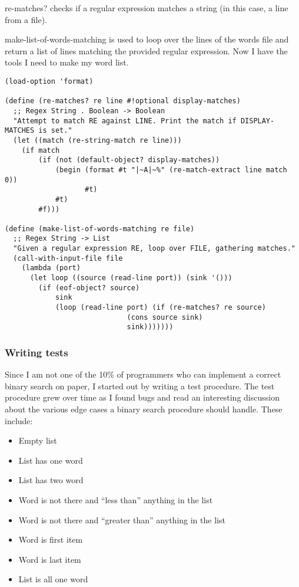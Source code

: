 \documentclass[12pt,openright,draft]{book}
\begin{document}
re-matches? checks if a regular expression matches a string (in this
case, a line from a file).

make-list-of-words-matching is used to loop over the lines of the
words file and return a list of lines matching the provided regular
expression.  Now I have the tools I need to make my word list.

\begin{verbatim}
(load-option 'format)

(define (re-matches? re line #!optional display-matches)
  ;; Regex String . Boolean -> Boolean
  "Attempt to match RE against LINE. Print the match if DISPLAY-MATCHES is set."
  (let ((match (re-string-match re line)))
    (if match
        (if (not (default-object? display-matches))
            (begin (format #t "|~A|~%" (re-match-extract line match 0))
                   #t)
            #t)
        #f)))

(define (make-list-of-words-matching re file)
  ;; Regex String -> List
  "Given a regular expression RE, loop over FILE, gathering matches."
  (call-with-input-file file
    (lambda (port)
      (let loop ((source (read-line port)) (sink '()))
        (if (eof-object? source)
            sink
            (loop (read-line port) (if (re-matches? re source)
                             (cons source sink)
                             sink)))))))
\end{verbatim}

\subsubsection{Writing tests}

Since I am not one of the 10\% of programmers who can implement a
correct binary search on paper, I started out by writing a test
procedure. The test procedure grew over time as I found bugs and read
an interesting discussion about the various edge cases a binary search
procedure should handle. These include:

\begin{itemize}
\item Empty list 
\item List has one word 
\item List has two word 
\item Word is not there and ``less than'' anything in the list 
\item Word is not there and ``greater than'' anything in the list 
\item Word is first item 
\item Word is last item 
\item List is all one word 
\end{itemize}
\end{document}
